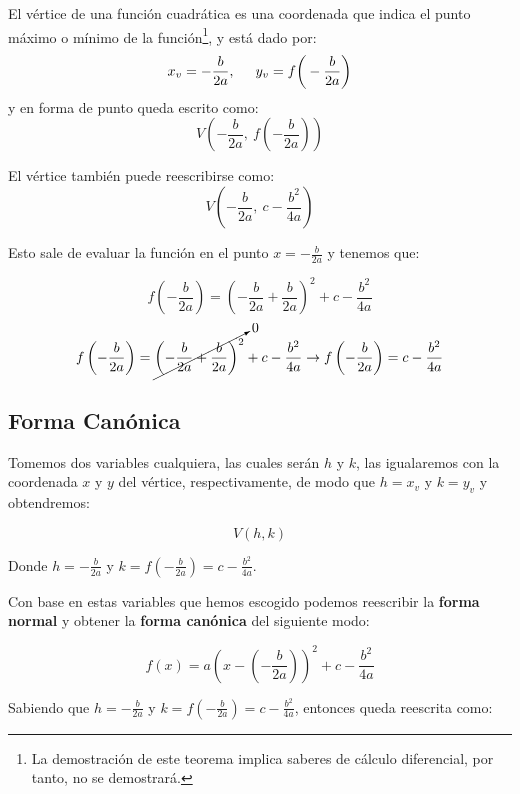 \documentclass[letterpaper, 10pt, oneside]{book}
\begin{document}
	\begin{tcolorbox}[title=Teorema, colback=white]
		El vértice de una función cuadrática es una coordenada que indica el punto máximo o mínimo de la función\footnote{La demostración de este teorema implica saberes de cálculo diferencial, por tanto, no se demostrará.}, y está dado por: $$x_v = -\frac{b}{2a}, \hspace{5mm} y_v = f\bigg(-\frac{b}{2a}\bigg)$$ y en forma de punto queda escrito como: $$V\left(-\frac{b}{2a}, \ f\left(-\frac{b}{2a}\right)\right)$$
	\end{tcolorbox}
	
	El vértice también puede reescribirse como: 
	$$V\left(-\frac{b}{2a}, \ c-\frac{b^2}{4a}\right)$$
	
	Esto sale de evaluar la función en el punto $\displaystyle{x=-\frac{b}{2a}}$ y tenemos que: 
	
	$$f\left(-\frac{b}{2a}\right) = \left(-\frac{b}{2a}+\frac{b}{2a}\right)^2+c-\frac{b^2}{4a}$$
	$$f\left(-\frac{b}{2a}\right) = \cancelto{0}{\left(-\frac{b}{2a}+\frac{b}{2a}\right)^2}+c-\frac{b^2}{4a} \rightarrow f\left(-\frac{b}{2a}\right) = c-\frac{b^2}{4a}$$
	
	\subsection{Forma Canónica}
	
	Tomemos dos variables cualquiera, las cuales serán $h$ y $k$, las igualaremos con la coordenada $x$ y $y$ del vértice, respectivamente, de modo que $h=x_v$ y $k=y_v$ y obtendremos:\newline 
	
	$$V(h, k)$$
	
	Donde $\displaystyle{h=-\frac{b}{2a}}$ y $\displaystyle{k=f\left(-\frac{b}{2a}\right) = c-\frac{b^2}{4a}}$.\newline
	
	Con base en estas variables que hemos escogido podemos reescribir la \textbf{forma normal} y obtener la \textbf{forma canónica} del siguiente modo:\newline
	
	$$f(x)=a\left(x-\left(-\frac{b}{2a}\right)\right)^2+c-\frac{b^2}{4a}$$\newline
	
	Sabiendo que $\displaystyle{h=-\frac{b}{2a}}$ y $\displaystyle{k=f\left(-\frac{b}{2a}\right) = c-\frac{b^2}{4a}}$, entonces queda reescrita como:\newline
	
\end{document}

